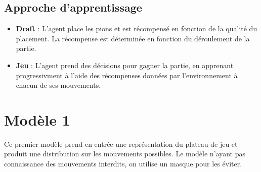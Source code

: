 \documentclass[]{article}
\begin{document}
\subsection{Approche d'apprentissage}
\begin{itemize}
    \item \textbf{Draft} : L'agent place les pions et est récompensé en fonction de la qualité du placement. La récompense est déterminée en fonction du déroulement de la partie.
    \item \textbf{Jeu} : L'agent prend des décisions pour gagner la partie, en apprenant progressivment à l'aide des récompenses données par l'environnement à chacun de ses mouvements.
\end{itemize}

\section{Modèle 1} %
Ce premier modèle prend en entrée une représentation du plateau de jeu et produit une distribution sur les mouvements possibles.
Le modèle n'ayant pas connaissance des mouvements interdits, on utilise un masque pour les éviter.
\end{document}
